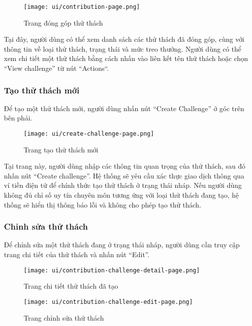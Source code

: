 \begin{figure}[H]
  \centering
  \texttt{[image: ui/contribution-page.png]}
  \caption{Trang đóng góp thử thách}
  \label{fig:contribution-page}
\end{figure}

Tại đây, người dùng có thể xem danh sách các thử thách đã đóng góp, cùng với thông tin về loại thử thách, trạng thái và mức treo thưởng.  
Người dùng có thể xem chi tiết một thử thách bằng cách nhấn vào liên kết tên thử thách hoặc chọn ``View challenge'' từ nút ``Actions``.

\subsubsection{Tạo thử thách mới}

Để tạo một thử thách mới, người dùng nhấn nút ``Create Challenge'' ở góc trên bên phải.

\begin{figure}[H]
  \centering
  \texttt{[image: ui/create-challenge-page.png]}
  \caption{Trang tạo thử thách mới}
  \label{fig:create-challenge-page}
\end{figure}

Tại trang này, người dùng nhập các thông tin quan trọng của thử thách, sau đó nhấn nút ``Create challenge''.  
Hệ thống sẽ yêu cầu xác thực giao dịch thông qua ví tiền điện tử để chính thức tạo thử thách ở trạng thái nháp.
Nếu người dùng không đủ chỉ số uy tín chuyên môn tương ứng với loại thử thách đang tạo, hệ thống sẽ hiển thị thông báo lỗi và không cho phép tạo thử thách.

\subsubsection{Chỉnh sửa thử thách}

Để chỉnh sửa một thử thách đang ở trạng thái nháp, người dùng cần truy cập trang chi tiết của thử thách và nhấn nút ``Edit''.

\begin{figure}[H]
  \centering
  \texttt{[image: ui/contribution-challenge-detail-page.png]}
  \caption{Trang chi tiết thử thách đã tạo}
  \label{fig:contribution-challenge-detail-page}
\end{figure}

\begin{figure}[H]
  \centering
  \texttt{[image: ui/contribution-challenge-edit-page.png]}
  \caption{Trang chỉnh sửa thử thách}
  \label{fig:contribution-challenge-edit-page}
\end{figure}

